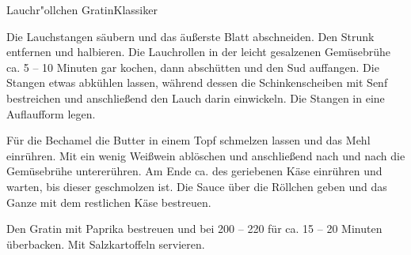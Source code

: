 \begin{recipe}{Lauchr"ollchen Gratin}{Klassiker}
  \label{Lauch-Gratin}
  \inglist[Lauchröllchen]


  \steps

  Die Lauchstangen säubern und das äußerste Blatt abschneiden. Den Strunk
  entfernen und halbieren. Die Lauchrollen in der leicht gesalzenen Gemüsebrühe
  ca. 5 -- 10 Minuten gar kochen, dann abschütten und den Sud auffangen. Die
  Stangen etwas abkühlen lassen, während dessen die Schinkenscheiben mit Senf
  bestreichen und anschließend den Lauch darin einwickeln. Die Stangen in eine
  Auflaufform legen.

  Für die Bechamel die Butter in einem Topf schmelzen lassen und das Mehl
  einrühren. Mit ein wenig Weißwein ablöschen und anschließend nach und nach
  die Gemüsebrühe untererühren. Am Ende ca. \zweidrittel des geriebenen Käse einrühren
  und warten, bis dieser geschmolzen ist.  Die Sauce über die Röllchen geben
  und das Ganze mit dem restlichen Käse bestreuen.

  Den Gratin mit Paprika bestreuen und bei 200 -- 220 \celsius für ca. 15 -- 20
  Minuten überbacken. Mit Salzkartoffeln servieren.

\end{recipe}

